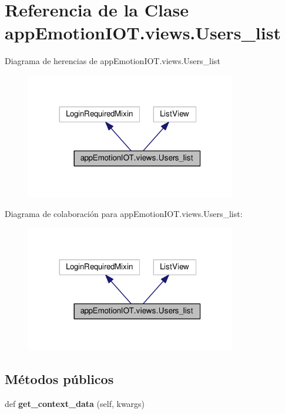 \hypertarget{classappEmotionIOT_1_1views_1_1Users__list}{}\section{Referencia de la Clase app\+Emotion\+I\+O\+T.\+views.\+Users\+\_\+list}
\label{classappEmotionIOT_1_1views_1_1Users__list}


Diagrama de herencias de app\+Emotion\+I\+O\+T.\+views.\+Users\+\_\+list
\nopagebreak
\begin{figure}[H]
\begin{center}
\leavevmode
\includegraphics[width=260pt]{classappEmotionIOT_1_1views_1_1Users__list__inherit__graph}
\end{center}
\end{figure}


Diagrama de colaboración para app\+Emotion\+I\+O\+T.\+views.\+Users\+\_\+list\+:
\nopagebreak
\begin{figure}[H]
\begin{center}
\leavevmode
\includegraphics[width=260pt]{classappEmotionIOT_1_1views_1_1Users__list__coll__graph}
\end{center}
\end{figure}
\subsection*{Métodos públicos}
\begin{DoxyCompactItemize}
\item 
def {\bfseries get\+\_\+context\+\_\+data} (self, kwargs)\hypertarget{classappEmotionIOT_1_1views_1_1Users__list_abc19ca9987fff53d88b582c55e1df3d4}{}\label{classappEmotionIOT_1_1views_1_1Users__list_abc19ca9987fff53d88b582c55e1df3d4}

\end{DoxyCompactItemize}
